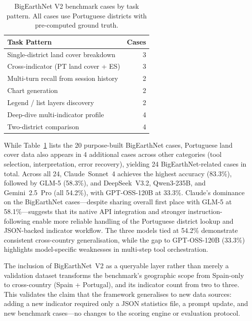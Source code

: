 \documentclass[10pt,twocolumn]{article}
\begin{document}
\begin{table}[t]
\caption{BigEarthNet V2 benchmark cases by task pattern. All cases use Portuguese districts with pre-computed ground truth.}
\label{tab:bigearth_cases}
\centering
\small
\begin{tabular}{lr}
\toprule
\textbf{Task Pattern} & \textbf{Cases} \\
\midrule
Single-district land cover breakdown     & 3 \\
Cross-indicator (PT land cover + ES)     & 3 \\
Multi-turn recall from session history   & 2 \\
Chart generation                         & 2 \\
Legend / list layers discovery            & 2 \\
Deep-dive multi-indicator profile        & 4 \\
Two-district comparison                  & 4 \\
\bottomrule
\end{tabular}
\end{table}

While Table~\ref{tab:bigearth_cases} lists the 20 purpose-built BigEarthNet cases, Portuguese land cover data also appears in 4 additional cases across other categories (tool selection, interpretation, error recovery), yielding 24 BigEarthNet-related cases in total. Across all 24, Claude~Sonnet~4 achieves the highest accuracy (83.3\%), followed by GLM-5 (58.3\%), and DeepSeek~V3.2, Qwen3-235B, and Gemini~2.5~Pro (all 54.2\%), with GPT-OSS-120B at 33.3\%. Claude's dominance on the BigEarthNet cases---despite sharing overall first place with GLM-5 at 58.1\%---suggests that its native API integration and stronger instruction-following enable more reliable handling of the Portuguese district lookup and JSON-backed indicator workflow. The three models tied at 54.2\% demonstrate consistent cross-country generalisation, while the gap to GPT-OSS-120B (33.3\%) highlights model-specific weaknesses in multi-step tool orchestration.

The inclusion of BigEarthNet~V2 as a queryable layer rather than merely a validation dataset transforms the benchmark's geographic scope from Spain-only to cross-country (Spain + Portugal), and its indicator count from two to three. This validates the claim that the framework generalises to new data sources: adding a new indicator required only a JSON statistics file, a prompt update, and new benchmark cases---no changes to the scoring engine or evaluation protocol.
\end{document}
